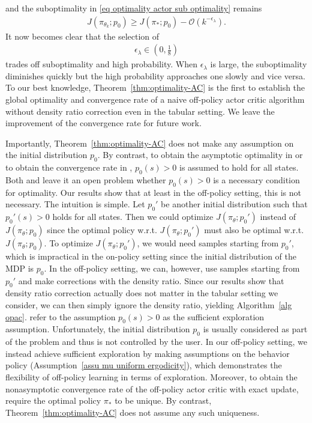 \documentclass[twoside,11pt]{article}
\newcommand{\fO}{\mathcal{O}}
\numberwithin{assucounter}{section}
\begin{document}
and the suboptimality in \eqref{eq optimality actor sub optimality} remains
\begin{align}
  J(\pi_{\theta_k}; p_0) \geq J(\pi_*; p_0) - \fO\left(k^{-\epsilon_\lambda} \right).
\end{align}
It now becomes clear that the selection of 
\begin{align}
  \label{eq optimal reg}
\epsilon_\lambda \in (0, \frac{1}{8})
\end{align}
trades off suboptimality and high probability.
When $\epsilon_\lambda$ is large,
the suboptimality diminishes quickly 
but the high probability approaches one slowly and vice versa. 
To our best knowledge,
Theorem~\ref{thm:optimality-AC} is the first to establish the global optimality and convergence rate
of a naive off-policy actor critic algorithm without density ratio correction even in the tabular setting.
We leave the improvement of the convergence rate for future work.

Importantly, Theorem~\ref{thm:optimality-AC} does not make any assumption on the initial distribution $p_0$.
By contrast,
to obtain the asymptotic optimality in \citet{agarwal2019optimality} or to obtain the convergence rate in \citet{mei2020global},
$p_0(s) > 0$ is assumed to hold for all states.
Both \citet{agarwal2019optimality} and \citet{mei2020global} leave it an open problem
whether $p_0(s) > 0$ is a necessary condition for optimality. 
Our results show that at least in the off-policy setting,
this is not necessary.
The intuition is simple.
Let $p_0'$ be another initial distribution such that $p_0'(s) > 0$ holds for all states.
Then we could optimize $J(\pi_\theta; p_0')$ instead of $J(\pi_\theta; p_0)$
since
the optimal policy w.r.t. $J(\pi_\theta; p_0')$ must also be optimal w.r.t. $J(\pi_\theta; p_0)$.
To optimize $J(\pi_\theta; p_0')$,
we would need samples starting from $p_0'$,
which is impractical in the on-policy setting
since the initial distribution of the MDP is $p_0$.
In the off-policy setting,
we can, however,
use samples starting from $p_0'$ and make corrections with the density ratio.
Since our results show that density ratio correction actually does not matter in the tabular setting we consider,
we can then simply ignore the density ratio,
yielding Algorithm~\ref{alg opac}.
\citet{agarwal2019optimality,mei2020global} refer to the assumption $p_0(s) > 0$ as the sufficient exploration assumption.
Unfortunately,
the initial distribution $p_0$ is usually considered as part of the problem and thus is not controlled by the user.
In our off-policy setting,
we instead achieve sufficient exploration by making assumptions on the behavior policy (Assumption~\ref{assu mu uniform ergodicity}),
which demonstrates the flexibility of off-policy learning in terms of exploration.
Moreover,
to obtain the nonasymptotic convergence rate
of the off-policy actor critic with exact update,
\citet{laroche2021dr} require the optimal policy $\pi_*$ to be unique.
By contrast,
Theorem~\ref{thm:optimality-AC} does not assume any such uniqueness.
\end{document}
